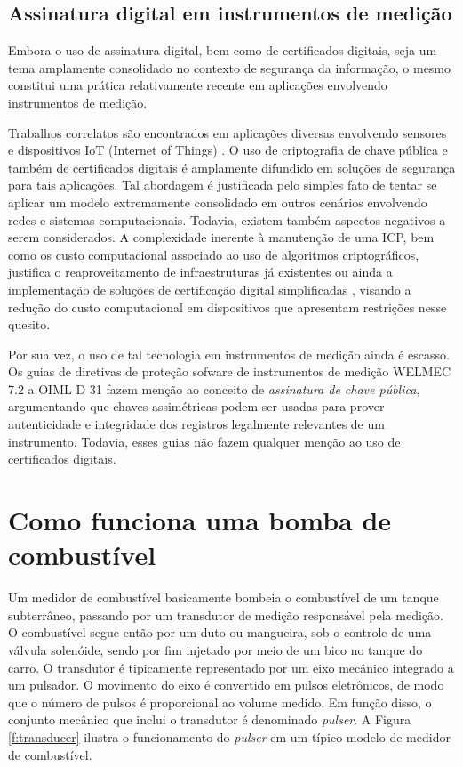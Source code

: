 \documentclass[12pt]{article}
\begin{document}
\subsection{Assinatura digital em instrumentos de medição}
Embora o uso de assinatura digital, bem como de certificados digitais, seja um tema amplamente consolidado no contexto de segurança da informação, o mesmo constitui uma prática relativamente recente em aplicações envolvendo instrumentos de medição.

Trabalhos correlatos são encontrados em aplicações diversas envolvendo sensores e dispositivos IoT (Internet of Things) \cite{Jing2014,Ray2015,AlSalami2016}.
O uso de criptografia de chave pública e também de certificados digitais é amplamente difundido em soluções de segurança para tais aplicações.
Tal abordagem é justificada pelo simples fato de tentar se aplicar um modelo extremamente consolidado em outros cenários envolvendo redes e sistemas computacionais.
Todavia, existem também aspectos negativos a serem considerados.
A complexidade inerente à manutenção de uma ICP, bem como os custo computacional associado ao uso de algoritmos criptográficos, justifica o reaproveitamento de infraestruturas já existentes \cite{Ray2015} ou ainda a implementação de soluções de certificação digital simplificadas \cite{AlSalami2016}, visando a redução do custo computacional em dispositivos que apresentam restrições nesse quesito.

Por sua vez, o uso de tal tecnologia em instrumentos de medição ainda é escasso.
Os guias de diretivas de proteção sofware de instrumentos de medição WELMEC 7.2 \cite{EuropeanCooperationinLegalMetrologyWELMEC2015} a OIML D 31 \cite{InternationalOrganizationofLegalMetrologyOIML2008} fazem menção ao conceito de \emph{assinatura de chave pública}, argumentando que chaves assimétricas podem ser usadas para prover autenticidade e integridade dos registros legalmente relevantes de um instrumento.
Todavia, esses guias não fazem qualquer menção ao uso de certificados digitais.


\section{Como funciona uma bomba de combustível}
Um medidor de combustível basicamente bombeia o combustível de um tanque subterrâneo, passando por um transdutor de medição responsável pela medição.
O combustível segue então por um duto ou mangueira, sob o controle de uma válvula solenóide, sendo por fim injetado por meio de um bico no tanque do carro.
O transdutor é tipicamente representado por um eixo mecânico integrado a um pulsador.
O movimento do eixo é convertido em pulsos eletrônicos, de modo que o número de pulsos é proporcional ao volume medido.
Em função disso, o conjunto mecânico que inclui o transdutor é denominado \textit{pulser}.
A Figura \ref{f:transducer} ilustra o funcionamento do \textit{pulser} em um típico modelo de medidor de combustível.
\end{document}
